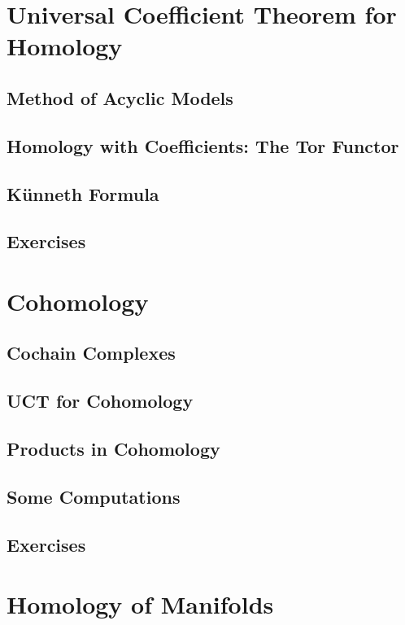 \section{Universal Coefficient Theorem for Homology}

\subsection{Method of Acyclic Models}

\subsection{Homology with Coefficients: The Tor Functor}

\subsection{Künneth Formula}

\subsection{Exercises}

\section{Cohomology}

\subsection{Cochain Complexes}

\subsection{UCT for Cohomology}

\subsection{Products in Cohomology}

\subsection{Some Computations}

\subsection{Exercises}

\section{Homology of Manifolds}

